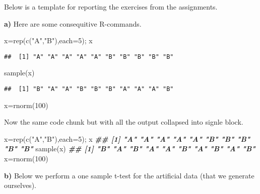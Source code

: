 \documentclass[
  11pt,
]{article}
\newenvironment{Shaded}{\begin{snugshade}}{\end{snugshade}}
\newcommand{\AttributeTok}[1]{\textcolor[rgb]{0.77,0.63,0.00}{#1}}
\newcommand{\DecValTok}[1]{\textcolor[rgb]{0.00,0.00,0.81}{#1}}
\newcommand{\DocumentationTok}[1]{\textcolor[rgb]{0.56,0.35,0.01}{\textbf{\textit{#1}}}}
\newcommand{\FunctionTok}[1]{\textcolor[rgb]{0.00,0.00,0.00}{#1}}
\newcommand{\NormalTok}[1]{#1}
\newcommand{\OtherTok}[1]{\textcolor[rgb]{0.56,0.35,0.01}{#1}}
\newcommand{\StringTok}[1]{\textcolor[rgb]{0.31,0.60,0.02}{#1}}
\begin{document}
Below is a template for reporting the exercises from the assignments.

\textbf{a)} Here are some consequitive R-commands.

\begin{Shaded}
\begin{Highlighting}[]
\NormalTok{x}\OtherTok{=}\FunctionTok{rep}\NormalTok{(}\FunctionTok{c}\NormalTok{(}\StringTok{"A"}\NormalTok{,}\StringTok{"B"}\NormalTok{),}\AttributeTok{each=}\DecValTok{5}\NormalTok{); x}
\end{Highlighting}
\end{Shaded}

\begin{verbatim}
##  [1] "A" "A" "A" "A" "A" "B" "B" "B" "B" "B"
\end{verbatim}

\begin{Shaded}
\begin{Highlighting}[]
\FunctionTok{sample}\NormalTok{(x)}
\end{Highlighting}
\end{Shaded}

\begin{verbatim}
##  [1] "B" "A" "A" "B" "B" "B" "A" "A" "A" "B"
\end{verbatim}

\begin{Shaded}
\begin{Highlighting}[]
\NormalTok{x}\OtherTok{=}\FunctionTok{rnorm}\NormalTok{(}\DecValTok{100}\NormalTok{)}
\end{Highlighting}
\end{Shaded}

Now the same code chunk but with all the output collapsed into signle
block.

\begin{Shaded}
\begin{Highlighting}[]
\NormalTok{x}\OtherTok{=}\FunctionTok{rep}\NormalTok{(}\FunctionTok{c}\NormalTok{(}\StringTok{"A"}\NormalTok{,}\StringTok{"B"}\NormalTok{),}\AttributeTok{each=}\DecValTok{5}\NormalTok{); x}
\DocumentationTok{\#\#  [1] "A" "A" "A" "A" "A" "B" "B" "B" "B" "B"}
\FunctionTok{sample}\NormalTok{(x)}
\DocumentationTok{\#\#  [1] "B" "A" "B" "A" "A" "B" "A" "B" "A" "B"}
\NormalTok{x}\OtherTok{=}\FunctionTok{rnorm}\NormalTok{(}\DecValTok{100}\NormalTok{)}
\end{Highlighting}
\end{Shaded}

\textbf{b)} Below we perform a one sample t-test for the artificial data
(that we generate ourselves).
\end{document}
